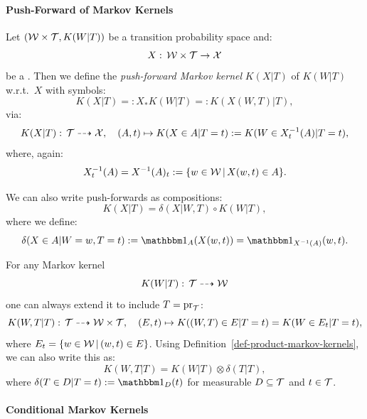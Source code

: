\paragraph{Push-Forward of Markov Kernels}



\begin{Def}
    Let $ (\mathcal{W} \times \mathcal{T},K(W|T))$ be a transition probability space and:
    \[ X:\, \mathcal{W} \times \mathcal{T} \to \mathcal{X}  \]
    be a \trv{}.
    Then we define the \emph{push-forward Markov kernel} $K(X|T)$ of $K(W|T)$ w.r.t.\ $X$ with symbols:
    \[K(X|T) =: X_*K(W|T) =: K(X(W,T)|T),\]
    via:
    \[ K(X|T):\, \mathcal{T} \dashrightarrow \mathcal{X},\quad (A,t) \mapsto K(X \in A|T=t) := K(W \in X^{-1}_t(A)|T=t), \]
    where, again:
    \[ X^{-1}_t(A) = X^{-1}(A)_t:= \{ w\in \mathcal{W}\,|\,X(w,t) \in A \}.\]
\end{Def}

\begin{Rem}
    We can also write push-forwards as compositions:
    \[K(X|T) = \delta(X|W,T) \circ K(W|T),\]
    where we define:
    \[\delta(X \in A|W=w,T=t) := \I_A(X(w,t)) = \I_{X^{-1}(A)}(w,t).\]
\end{Rem}

\begin{Rem}\label{rem:extending_markov_kernel}
    For any Markov kernel
    \[ K(W|T):\, \mathcal{T} \dashrightarrow \mathcal{W}\]
    one can always extend it to include $T=\mathrm{pr}_{\mathcal{T}}$:
    \[ K(W,T|T):\, \mathcal{T} \dashrightarrow \mathcal{W} \times \mathcal{T},\quad (E,t) \mapsto 
    K( (W,T)  \in E| T=t) = K( W \in E_t|T=t), \]
    where $E_t = \{ w \in \mathcal{W}\,|\,(w,t) \in E\}$.
    Using Definition~\ref{def-product-markov-kernels}, we can also write this as:
    \[ K(W,T|T) = K(W|T) \otimes \delta(T|T),\]
    where $\delta(T \in D|T=t) := \I_D(t)$ for measurable $D \subseteq \mathcal{T}$ and $t \in \mathcal{T}$.
\end{Rem}


\paragraph{Conditional Markov Kernels}

